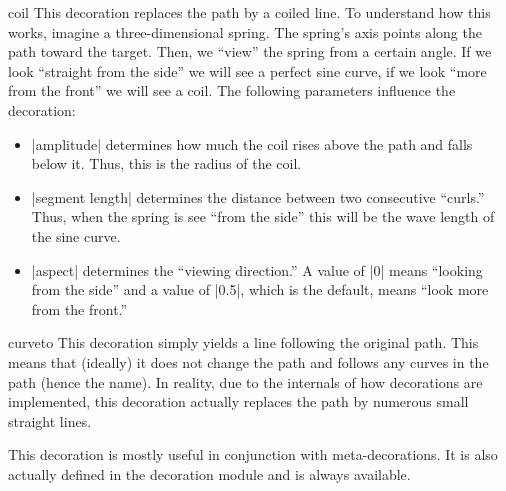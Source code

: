 \begin{decoration}{coil}
  This decoration replaces the path by a coiled line. To understand how this works,
  imagine a three-dimensional spring. The spring's axis points along
  the path toward the target. Then, we ``view'' the spring from a
  certain angle. If we look ``straight from the side'' we will see a
  perfect sine curve, if we look ``more from the front'' we will see a
  coil. The following parameters influence the decoration:  
  \begin{itemize}
  \item |amplitude|
    determines how much the coil rises above the path and falls below
    it. Thus, this is the radius of the coil.
  \item |segment length|
    determines the distance between two consecutive ``curls.'' Thus,
    when the spring is see ``from the side'' this will be the wave
    length of the sine curve. 
  \item |aspect|
    determines the ``viewing direction.'' A value of |0| means
    ``looking from the side'' and a value of |0.5|, which is the
    default, means ``look more from the front.'' 
  \end{itemize}
\begin{codeexample}[]
\end{codeexample}
\begin{codeexample}[]
\end{codeexample}
\end{decoration}



\begin{decoration}{curveto}
  This decoration simply yields a line following the original
  path. This means that (ideally) it does not change the path and
  follows any curves in the path (hence the name). In
  reality, due to the internals of how decorations are implemented,
  this decoration actually replaces the path by numerous small
  straight lines.

  This decoration is mostly useful in conjunction with
  meta-decorations. It is also actually defined in the decoration
  module and is always available.

\begin{codeexample}[]
\end{codeexample}
\end{decoration}



